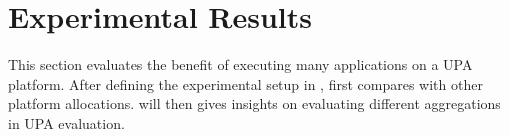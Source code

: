 \vspace{-2pt}
\section{Experimental Results}
\label{sec:results}


This section evaluates the benefit of executing many applications on a UPA platform. 
After defining the experimental setup in ,  first compares with other platform allocations.  will then gives insights on evaluating different aggregations in UPA evaluation. 














